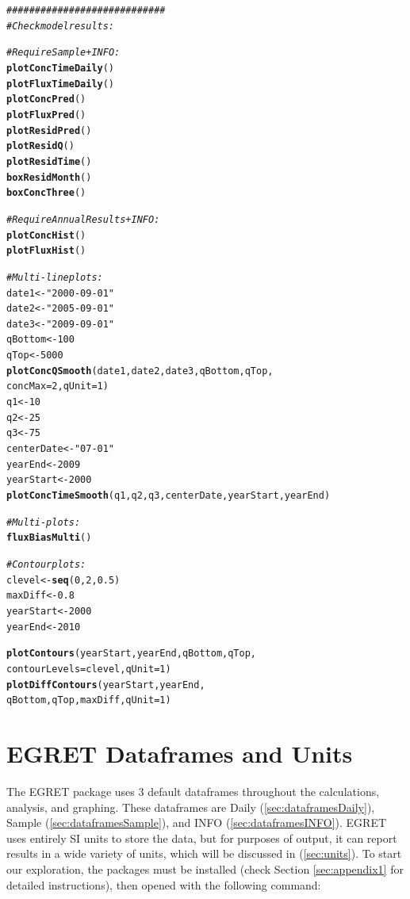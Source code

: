 \documentclass[a4paper,11pt]{article}\usepackage[]{graphicx}\usepackage[]{color}
\makeatletter
\newcommand{\hlnum}[1]{\textcolor[rgb]{0.686,0.059,0.569}{#1}}%
\newcommand{\hlstr}[1]{\textcolor[rgb]{0.192,0.494,0.8}{#1}}%
\newcommand{\hlcom}[1]{\textcolor[rgb]{0.678,0.584,0.686}{\textit{#1}}}%
\newcommand{\hlstd}[1]{\textcolor[rgb]{0.345,0.345,0.345}{#1}}%
\newcommand{\hlkwb}[1]{\textcolor[rgb]{0.69,0.353,0.396}{#1}}%
\newcommand{\hlkwc}[1]{\textcolor[rgb]{0.333,0.667,0.333}{#1}}%
\newcommand{\hlkwd}[1]{\textcolor[rgb]{0.737,0.353,0.396}{\textbf{#1}}}%
\newenvironment{kframe}{%
 \def\at@end@of@kframe{}%
 \ifinner\ifhmode%
  \def\at@end@of@kframe{\end{minipage}}%
  \begin{minipage}{\columnwidth}%
 \fi\fi%
 \def\FrameCommand##1{\hskip\@totalleftmargin \hskip-\fboxsep
 \colorbox{shadecolor}{##1}\hskip-\fboxsep
     \hskip-\linewidth \hskip-\@totalleftmargin \hskip\columnwidth}%
 \MakeFramed {\advance\hsize-\width
   \@totalleftmargin\z@ \linewidth\hsize
   \@setminipage}}%
 {\par\unskip\endMakeFramed%
 \at@end@of@kframe}
\newenvironment{knitrout}{}{} %
\makeatother
\begin{document}
\begin{knitrout}
\begin{kframe}
\begin{alltt}
\hlcom{############################}
\hlcom{#Check model results:}

\hlcom{#Require Sample + INFO:}
\hlkwd{plotConcTimeDaily}\hlstd{()}
\hlkwd{plotFluxTimeDaily}\hlstd{()}
\hlkwd{plotConcPred}\hlstd{()}
\hlkwd{plotFluxPred}\hlstd{()}
\hlkwd{plotResidPred}\hlstd{()}
\hlkwd{plotResidQ}\hlstd{()}
\hlkwd{plotResidTime}\hlstd{()}
\hlkwd{boxResidMonth}\hlstd{()}
\hlkwd{boxConcThree}\hlstd{()}

\hlcom{#Require AnnualResults + INFO:}
\hlkwd{plotConcHist}\hlstd{()}
\hlkwd{plotFluxHist}\hlstd{()}

\hlcom{# Multi-line plots:}
\hlstd{date1} \hlkwb{<-} \hlstr{"2000-09-01"}
\hlstd{date2} \hlkwb{<-} \hlstr{"2005-09-01"}
\hlstd{date3} \hlkwb{<-} \hlstr{"2009-09-01"}
\hlstd{qBottom}\hlkwb{<-}\hlnum{100}
\hlstd{qTop}\hlkwb{<-}\hlnum{5000}
\hlkwd{plotConcQSmooth}\hlstd{(date1, date2, date3, qBottom, qTop,}
                   \hlkwc{concMax}\hlstd{=}\hlnum{2}\hlstd{,}\hlkwc{qUnit}\hlstd{=}\hlnum{1}\hlstd{)}
\hlstd{q1} \hlkwb{<-} \hlnum{10}
\hlstd{q2} \hlkwb{<-} \hlnum{25}
\hlstd{q3} \hlkwb{<-} \hlnum{75}
\hlstd{centerDate} \hlkwb{<-} \hlstr{"07-01"}
\hlstd{yearEnd} \hlkwb{<-} \hlnum{2009}
\hlstd{yearStart} \hlkwb{<-} \hlnum{2000}
\hlkwd{plotConcTimeSmooth}\hlstd{(q1, q2, q3, centerDate, yearStart, yearEnd)}

\hlcom{# Multi-plots:}
\hlkwd{fluxBiasMulti}\hlstd{()}

\hlcom{#Contour plots:}
\hlstd{clevel}\hlkwb{<-}\hlkwd{seq}\hlstd{(}\hlnum{0}\hlstd{,}\hlnum{2}\hlstd{,}\hlnum{0.5}\hlstd{)}
\hlstd{maxDiff}\hlkwb{<-}\hlnum{0.8}
\hlstd{yearStart} \hlkwb{<-} \hlnum{2000}
\hlstd{yearEnd} \hlkwb{<-} \hlnum{2010}

\hlkwd{plotContours}\hlstd{(yearStart,yearEnd,qBottom,qTop,}
             \hlkwc{contourLevels} \hlstd{= clevel,}\hlkwc{qUnit}\hlstd{=}\hlnum{1}\hlstd{)}
\hlkwd{plotDiffContours}\hlstd{(yearStart,yearEnd,}
                 \hlstd{qBottom,qTop,maxDiff,}\hlkwc{qUnit}\hlstd{=}\hlnum{1}\hlstd{)}
\end{alltt}
\end{kframe}
\end{knitrout}



\section{EGRET Dataframes and Units}
\label{sec:dataframes}
The EGRET package uses 3 default dataframes throughout the calculations, analysis, and graphing. These dataframes are Daily (\ref{sec:dataframesDaily}), Sample (\ref{sec:dataframesSample}), and INFO (\ref{sec:dataframesINFO}). EGRET uses entirely SI units to store the data, but for purposes of output, it can report results in a wide variety of units, which will be discussed in (\ref{sec:units}). To start our exploration, the packages must be installed (check Section \ref{sec:appendix1} for detailed instructions), then opened with the following command:
\end{document}
